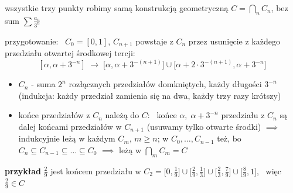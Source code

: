 \documentclass[a4paper,12pt]{article}
\begin{document}
\smallskip
wszystkie trzy punkty robimy samą konstrukcją geometryczną \(C = \bigcap_n C_n\), bez sum \(\sum \frac{a_n}{3^n}\)

\smallskip
przygotowanie: \, \(C_0 = [0, 1]\), \; \(C_{n+1}\) powstaje z \(C_n\) przez usunięcie z każdego przedziału otwartej środkowej tercji:
\[
[\alpha, \alpha + 3^{-n}] \;\longrightarrow\; \big[\alpha, \alpha + 3^{-(n+1)}\big] \cup \big[\alpha + 2 \cdot 3^{-(n+1)}, \alpha + 3^{-n}\big]
\]
\begin{itemize}
    \item[(F1)] \(C_n\) - suma \(2^n\) rozłącznych przedziałów domkniętych, każdy długości \(3^{-n}\) \, (indukcja: każdy przedział zamienia się na dwa, każdy trzy razy krótszy)
    \item[(F2)] końce przedziałów z \(C_n\) należą do \(C\): \, końce \(\alpha, \; \alpha + 3^{-n}\) przedziału z \(C_n\) są dalej końcami przedziałów w \(C_{n+1}\) (usuwamy tylko otwarte środki) \(\implies\) indukcyjnie leżą w każdym \(C_m\), \(m \geq n\); \; w \(C_0, \dots, C_{n-1}\) też, bo \(C_n \subseteq C_{n-1} \subseteq \dots \subseteq C_0\) \(\implies\) leżą w \(\bigcap_m C_m = C\)
\end{itemize}

\bigskip
\begin{logbox}
\textbf{przykład} \; \(\frac{2}{9}\) jest końcem przedziału w \(C_2 = \big[0, \frac{1}{9}\big] \cup \big[\frac{2}{9}, \frac{1}{3}\big] \cup \big[\frac{2}{3}, \frac{7}{9}\big] \cup \big[\frac{8}{9}, 1\big]\), \, więc \(\frac{2}{9} \in C\)
\end{logbox}
\end{document}
